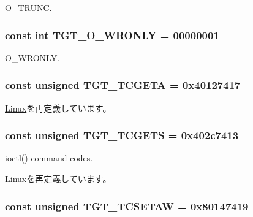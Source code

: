 O\_\-TRUNC. \hypertarget{classPowerLinux_a6156c069cefe05ce3cce033b2e0c2de2}{
\subsubsection[{TGT\_\-O\_\-WRONLY}]{\setlength{\rightskip}{0pt plus 5cm}const int {\bf TGT\_\-O\_\-WRONLY} = 00000001}}
\label{classPowerLinux_a6156c069cefe05ce3cce033b2e0c2de2}


O\_\-WRONLY. \hypertarget{classPowerLinux_a804fc265279c5dbd78e0f95da998b267}{
\subsubsection[{TGT\_\-TCGETA}]{\setlength{\rightskip}{0pt plus 5cm}const unsigned {\bf TGT\_\-TCGETA} = 0x40127417}}
\label{classPowerLinux_a804fc265279c5dbd78e0f95da998b267}


\hyperlink{classLinux_a804fc265279c5dbd78e0f95da998b267}{Linux}を再定義しています。\hypertarget{classPowerLinux_a50e5d880569ec2cb9a2f3d4aaa55cc64}{
\subsubsection[{TGT\_\-TCGETS}]{\setlength{\rightskip}{0pt plus 5cm}const unsigned {\bf TGT\_\-TCGETS} = 0x402c7413}}
\label{classPowerLinux_a50e5d880569ec2cb9a2f3d4aaa55cc64}


ioctl() command codes. 

\hyperlink{classLinux_a50e5d880569ec2cb9a2f3d4aaa55cc64}{Linux}を再定義しています。\hypertarget{classPowerLinux_a96e06e042526ea5e89c4e8a020636c52}{
\subsubsection[{TGT\_\-TCSETAW}]{\setlength{\rightskip}{0pt plus 5cm}const unsigned {\bf TGT\_\-TCSETAW} = 0x80147419}}
\label{classPowerLinux_a96e06e042526ea5e89c4e8a020636c52}


